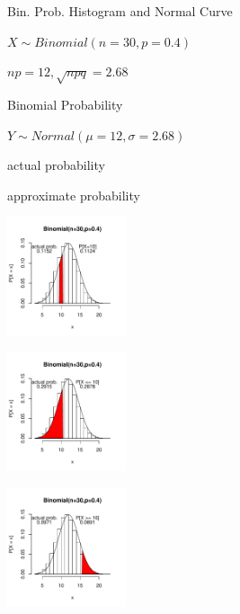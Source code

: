\documentclass[14pt]{beamer}\usepackage[]{graphicx}\usepackage[]{color}
\begin{document}
\begin{frame}[fragile]{Bin. Prob. Histogram and Normal Curve }



\begin{minipage}[ht]{4cm}

{\scriptsize{

$X \sim Binomial(n=30,p=0.4)$

$np = 12, \sqrt{npq} = 2.68$

Binomial Probability

$ Y \sim Normal(\mu = 12, \sigma = 2.68)$ 

actual probability

approximate probability
}}
\end{minipage}
\begin{minipage}[ht]{3.5cm}


\includegraphics[width=3.5cm]{figure/LBL7e-1} 


\end{minipage}

\begin{minipage}[ht]{3.5cm}


\includegraphics[width=3.5cm]{figure/LBL7f-1} 


\end{minipage}
\begin{minipage}[ht]{3.5cm}


\includegraphics[width=3.5cm]{figure/LBL7g-1} 


\end{minipage}

\end{frame}
\end{document}
